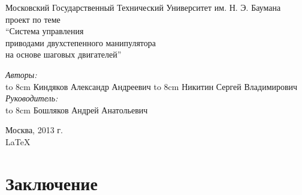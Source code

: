 \documentclass{article}
\begin{document}
\begin{titlepage}
\begin{center}
    {\large Московский Государственный Технический Университет им. Н. Э. Баумана}
    \\[50mm]
    { проект по теме}
    \\[7mm]
    {\LARGE ``Система управления \\ приводами двухстепенного манипулятора \\ на основе шаговых двигателей''}
    \\[37mm]

    \begin{flushright}
        \begin{minipage}{0.5\textwidth}
            \begin{flushleft}
                \textit{Авторы:} \\
                \hbox to 8cm {Киндяков Александр Андреевич \hfil \underline{\hspace{2cm} } }
                \vspace{\baselineskip}
                \hbox to 8cm {Никитин Сергей Владимирович \hfil \underline{\hspace{2cm} } }
                \vspace{2cm}
                \textit{Руководитель:} \\
                \hbox to 8cm {Бошляков Андрей Анатольевич \hfil \underline{\hspace{2cm} } }
            \end{flushleft}
        \end{minipage}
    \end{flushright}

    \vfill %
    Москва, 2013 г. \\
    \LaTeX
\end{center}
\end{titlepage}

\tableofcontents
\newpage







\newpage

\section{Заключение}
\end{document}

